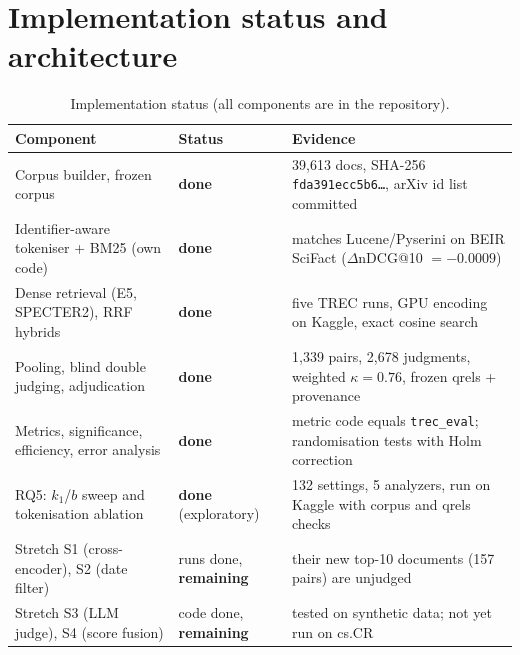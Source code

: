 \documentclass[10pt,a4paper]{article}
\newcommand{\done}{\textcolor{green!45!black}{\textbf{done}}}
\newcommand{\todo}{\textcolor{orange!80!black}{\textbf{remaining}}}
\newcommand{\sect}[1]{\vspace{2pt}\section{#1}\vspace{-2pt}}
\begin{document}
\sect{Implementation status and architecture}
\begin{table}[H]\centering\small
\caption{Implementation status (all components are in the repository).}\label{tab:status}
\begin{tabularx}{\linewidth}{@{}l l X@{}}
\toprule
Component & Status & Evidence\\
\midrule
Corpus builder, frozen corpus & \done & 39{,}613 docs, SHA-256 \texttt{fda391ecc5b6\ldots}, arXiv id list committed\\
Identifier-aware tokeniser + BM25 (own code) & \done & matches Lucene/Pyserini on BEIR SciFact ($\Delta$nDCG@10 $=-0.0009$)\\
Dense retrieval (E5, SPECTER2), RRF hybrids & \done & five TREC runs, GPU encoding on Kaggle, exact cosine search\\
Pooling, blind double judging, adjudication & \done & 1{,}339 pairs, 2{,}678 judgments, weighted $\kappa=0.76$, frozen qrels + provenance\\
Metrics, significance, efficiency, error analysis & \done & metric code equals \texttt{trec\_eval}; randomisation tests with Holm correction\\
RQ5: $k_1$/$b$ sweep and tokenisation ablation & \done{} (exploratory) & 132 settings, 5 analyzers, run on Kaggle with corpus and qrels checks\\
Stretch S1 (cross-encoder), S2 (date filter) & runs done, \todo & their new top-10 documents (157 pairs) are unjudged\\
Stretch S3 (LLM judge), S4 (score fusion) & code done, \todo & tested on synthetic data; not yet run on cs.CR\\
\bottomrule
\end{tabularx}
\end{table}
\end{document}
